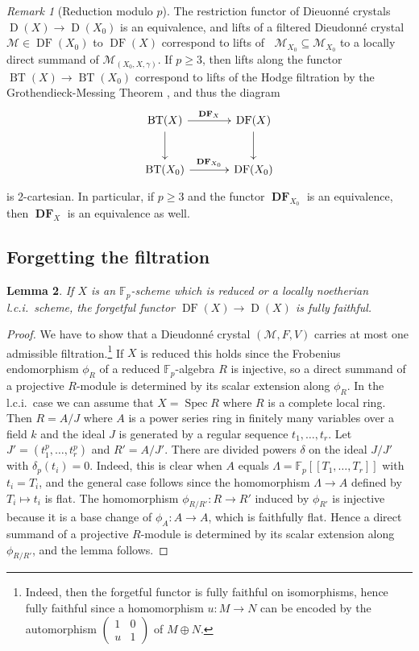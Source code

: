 \documentclass[a4paper,11pt]{article}
\theoremstyle{plain}
\newtheorem{Lemma}{Lemma}
\theoremstyle{definition}
\theoremstyle{remark}
\newtheorem{Remark}[Lemma]{Remark}
\theoremstyle{definition}
\numberwithin{Lemma}{section}
\numberwithin{Subpoint}{Lemma}
\numberwithin{equation}{section}
\newcommand{\MMM}{\mathcal{M}}
\newcommand{\DD}{{\mathbb{D}}}
\newcommand{\FF}{{\mathbb{F}}}
\DeclareMathOperator{\BT}{BT}
\DeclareMathOperator{\Dcat}{D}
\DeclareMathOperator{\DFcat}{DF}
\DeclareMathOperator{\DFfun}{\mathbf{DF}} %
\DeclareMathOperator{\Filone}{Fil^1}
\DeclareMathOperator{\Spec}{Spec}
\renewcommand{\u}{\underline}
\newcommand{\chang}[1]{{#1}}
\begin{document}
\begin{Remark}[Reduction modulo $p$]
\label{Rk:red-BT-DDF}
The restriction functor of Dieuonn\'e crystals  
$\Dcat(X)\to\Dcat(X_0)$ is an equivalence, 
and lifts of a filtered Dieudonn\'e crystal
$\MMM\in\DFcat(X_0)$ 
to $\DFcat(X)$
correspond to lifts of $\Filone\MMM_{X_0}\subseteq\MMM_{X_0}$ 
to a locally direct summand of $\MMM_{(X_0,X,\gamma)}$.
If $p\ge 3$, then lifts \chang{along} the functor $\BT(X)\to\BT(X_0)$
correspond to lifts of the Hodge filtration 
by the Grothendieck-Messing Theorem \cite{Messing:Crystals},
and thus the diagram
\[
\xymatrix@M+0.2em@C+1em{
\BT(X) \ar[r]^{\DFfun_X} \ar[d] &
\DFcat(X) \ar[d] \\
\BT(X_0) \ar[r]^{\DFfun_{X_0}} &
\DFcat(X_0)
}
\]
is 2-cartesian.
In particular, if $p\ge 3$ and 
the functor $\DFfun_{X_0}$ is an equivalence,
then $\DFfun_{X}$ is an equivalence as well.
\end{Remark}

\subsection*{Forgetting the filtration}

\begin{Lemma}
\label{Le:DF-D-ff}
If $X$ is an $\FF_p$-scheme 
which is reduced or a locally noetherian l.c.i.\ scheme, 
the forgetful functor $\DFcat(X)\to\Dcat(X)$ is fully faithful.
\end{Lemma}

\begin{proof}
We have to show that a Dieudonn\'e crystal $(\MMM,F,V)$ carries at most
one admissible filtration.\footnote{\chang{Indeed, then the forgetful functor is fully faithful on isomorphisms, hence fully faithful since a homomorphism $u:M\to N$ can be encoded by the automorphism $\left(\begin{smallmatrix}1&0\\u&1\end{smallmatrix}\right)$ of $M\oplus N$.}}
If $X$ is reduced this holds since the
Frobenius endomorphism $\phi_R$ of a reduced $\FF_p$-algebra $R$ is injective,
so a direct summand of a projective $R$-module is determined by its
scalar extension \chang{along} $\phi_R$.
In the l.c.i.\ case 
we can assume that $X=\Spec R$ where $R$ is a complete local ring. 
Then $R=A/J$ where $A$ is a power series ring in finitely many variables over a field $k$ and the ideal $J$ is generated by a regular sequence $t_1,\ldots,t_r$. 
Let $J'=(t_1^p,\ldots,t_r^p)$ and $R'=A/J'$.
There are divided powers $\delta$ on the ideal $J/J'$ with 
$\delta_p(t_i)=0$.
Indeed, this is clear when $A$ equals 
$\Lambda=\FF_p[[T_1,\ldots,T_r]]$ with $t_i=T_i$,
and the general case follows since the homomorphism 
$\Lambda\to A$ defined by $T_i\mapsto t_i$ is flat.
The homomorphism $\phi_{R/R'}:R\to R'$ induced by $\phi_{R'}$
is injective because it is a base change of $\phi_A:A\to A$, 
which is faithfully flat. 
Hence a direct summand of a projective $R$-module is determined by its
scalar extension \chang{along} $\phi_{R/R'}$, and the lemma follows.
\end{proof}
\end{document}
